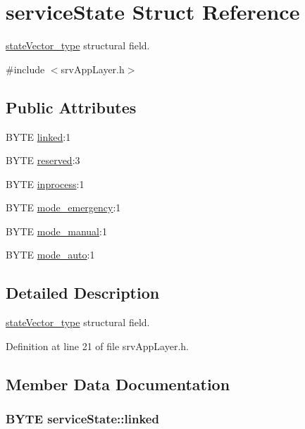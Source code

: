 \hypertarget{structserviceState}{
\section{serviceState Struct Reference}
\label{db/d35/structserviceState}
}


\hyperlink{structstateVector__type}{stateVector\_\-type} structural field.  




{\ttfamily \#include $<$srvAppLayer.h$>$}

\subsection*{Public Attributes}
\begin{DoxyCompactItemize}
\item 
BYTE \hyperlink{structserviceState_a0fb6a0ecf03f8ee6009be0b58d65a31b}{linked}:1
\item 
BYTE \hyperlink{structserviceState_a8717ec19a9ae6e498162aeb27383e754}{reserved}:3
\item 
BYTE \hyperlink{structserviceState_ace4544bc3fe8f584b9d6587998fbb8df}{inprocess}:1
\item 
BYTE \hyperlink{structserviceState_a2d16ebd2d557bc59a64381256ca91ff5}{mode\_\-emergency}:1
\item 
BYTE \hyperlink{structserviceState_ad3bdd4769b24a8771b74270bf9dc0745}{mode\_\-manual}:1
\item 
BYTE \hyperlink{structserviceState_a735dde453a714b0f2fcd60521df2699f}{mode\_\-auto}:1
\end{DoxyCompactItemize}


\subsection{Detailed Description}
\hyperlink{structstateVector__type}{stateVector\_\-type} structural field. 

Definition at line 21 of file srvAppLayer.h.



\subsection{Member Data Documentation}
\hypertarget{structserviceState_a0fb6a0ecf03f8ee6009be0b58d65a31b}{
\subsubsection[{linked}]{\setlength{\rightskip}{0pt plus 5cm}BYTE {\bf serviceState::linked}}}
\label{db/d35/structserviceState_a0fb6a0ecf03f8ee6009be0b58d65a31b}


